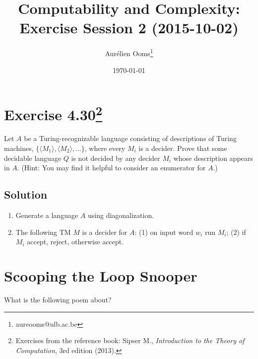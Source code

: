 \documentclass{article}
\title{Computability and Complexity:\\Exercise Session 2 (2015-10-02)}
\author{Aurélien Ooms\footnote{aureooms@ulb.ac.be}}
\date{\today}
\newcommand{\TM}{TM}
\begin{document}
\maketitle
\tableofcontents

\section{Exercise 4.30\footnote{Exercises from the reference book: Sipser M.,
\emph{Introduction to the Theory of Computation}, 3rd edition (2013).}}

Let \(A\) be a Turing-recognizable language consisting of descriptions of
Turing machines,
\(\{\langle M_1 \rangle, \langle M_2 \rangle, \ldots \}\),
where every \(M_i\) is a decider. Prove that some decidable
language \(Q\) is not decided by any decider \(M_i\) whose description appears in
\(A\).
(Hint: You may find it helpful to consider an enumerator for \(A\).)

\subsection{Solution}
\begin{enumerate}
\item Generate a language \(A\) using diagonalization.
\item The following \TM{} \(M\) is a decider for \(A\): (1) on input word \(w_i\)
run \(M_i\); (2) if \(M_i\) accept, reject, otherwise accept.
\end{enumerate}

\section{Scooping the Loop Snooper}
What is the following poem about?
\end{document}
